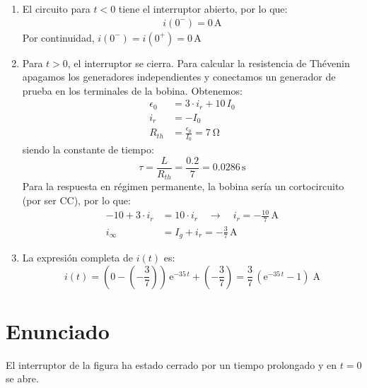 \begin{enumerate}
    \item El circuito para $t<0$ tiene el interruptor abierto, por lo que:
    \begin{align*}
        i(0^-)=0\,\si{\ampere}
    \end{align*}
    Por continuidad, $i(0^-)=i(0^+)=0\,\si{\ampere}$ 
    \item Para $t>0$, el interruptor se cierra. Para calcular la resistencia de Thévenin apagamos los generadores independientes y conectamos un generador de prueba en los terminales de la bobina. Obtenemos:
    \begin{align*}
      \epsilon_0 &= 3\cdot i_r + 10 \, I_0\\
      i_r &= - I_0\\
      R_{th} &= \frac{\epsilon_0}{I_0} = \qty{7}{\ohm}
    \end{align*}
    siendo la constante de tiempo:
    \begin{equation*}
        \tau=\dfrac{L}{R_{th}}=\dfrac{0.2}{7}=0.0286\,\si{\second}
    \end{equation*}
    Para la respuesta en régimen permanente, la bobina sería un cortocircuito (por ser CC), por lo que:
    \begin{align*}
      -10 + 3 \cdot i_r &= 10 \cdot i_r \quad\rightarrow\quad i_r = -\frac{10}{7}\,\unit{\ampere}\\
      i_{\infty} &= I_g + i_r = -\frac{3}{7}\,\unit{\ampere}
    \end{align*}
    
    \item La expresión completa de $i(t)$ es:
    \begin{equation*}
        i(t)=\left(0-\left(-\dfrac{3}{7}\right) \right)\,\mathrm{e}^{-35\,t}+\left(-\dfrac{3}{7}\right)=\dfrac{3}{7}\,(\mathrm{e}^{-35\,t}-1)\;\si{\ampere}
    \end{equation*}
\end{enumerate}



\section{Enunciado}

El interruptor de la figura ha estado cerrado por un tiempo prolongado y en $t = 0$ se abre.

